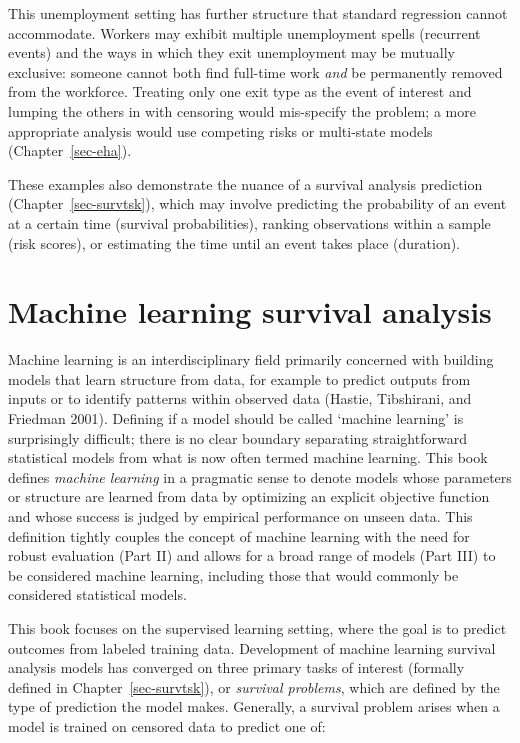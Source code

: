 \documentclass[
  letterpaper,
  krantz2]{style/krantz}
\begin{document}
This unemployment setting has further structure that standard regression
cannot accommodate. Workers may exhibit multiple unemployment spells
(recurrent events) and the ways in which they
exit unemployment may be mutually exclusive: someone cannot both find
full-time work \emph{and} be permanently removed from the workforce.
Treating only one exit type as the event of interest and lumping the
others in with censoring would mis-specify the problem; a more
appropriate analysis would use competing risks or
multi-state models (Chapter~\ref{sec-eha}).

These examples also demonstrate the nuance of a survival analysis
prediction (Chapter~\ref{sec-survtsk}), which may involve predicting the
probability of an event at a certain time (survival
probabilities), ranking observations within
a sample (risk scores), or estimating the time
until an event takes place (duration).

\section{Machine learning survival analysis}\label{sec-intro-mlsa}

Machine learning is an interdisciplinary field primarily concerned with
building models that learn structure from data, for example to predict
outputs from inputs or to identify patterns within observed data
(Hastie, Tibshirani, and Friedman 2001). Defining if a model should be
called `machine learning' is surprisingly
difficult; there is no clear boundary separating straightforward
statistical models from what is now often termed machine learning. This
book defines \emph{machine learning} in a pragmatic sense to denote
models whose parameters or structure are learned from data by optimizing
an explicit objective function and whose success is judged by empirical
performance on unseen data. This definition tightly couples the concept
of machine learning with the need for robust
evaluation (Part II) and allows for a broad
range of models (Part III) to be considered machine learning, including
those that would commonly be considered statistical models.

This book focuses on the supervised
learning setting, where the
goal is to predict outcomes from labeled training data. Development of
machine learning survival
analysis models has converged
on three primary tasks of interest (formally
defined in Chapter~\ref{sec-survtsk}), or \emph{survival problems},
which are defined by the type of prediction the model makes. Generally,
a survival problem arises when a model is trained on censored data to
predict one of:
\end{document}
